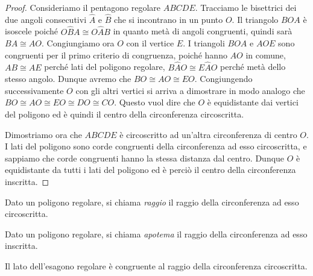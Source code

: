 \begin{proof}
Consideriamo il pentagono regolare $ABCDE$. Tracciamo le bisettrici 
dei due angoli consecutivi $\widehat{A}$ e $\widehat{B}$ che si 
incontrano in un punto $O$. Il triangolo $BOA$ è isoscele poiché 
$O\widehat{B}A\cong O\widehat{A}B$ in quanto metà di angoli 
congruenti, quindi sarà $BA\cong AO$. Congiungiamo ora $O$ con il 
vertice $E$. I triangoli $BOA$ e $AOE$ sono congruenti per il primo 
criterio di congruenza, poiché hanno $AO$ in comune, $AB\cong AE$ 
perché lati del poligono regolare, $B\widehat{A}O\cong E\widehat{A}O$ 
perché metà dello stesso angolo. Dunque avremo che $BO\cong AO\cong 
EO$. Congiungendo successivamente $O$ con gli altri vertici si arriva 
a dimostrare in modo analogo che $BO\cong AO\cong EO\cong DO\cong 
CO$. Questo vuol dire che $O$ è equidistante dai vertici del poligono 
ed è quindi il centro della circonferenza circoscritta.

Dimostriamo ora che $ABCDE$ è circoscritto ad un'altra circonferenza 
di centro $O$. I lati del poligono sono corde congruenti della 
circonferenza ad esso circoscritta, e sappiamo che corde congruenti 
hanno la stessa distanza dal centro. Dunque $O$ è equidistante da 
tutti i lati del poligono ed è perciò il centro della circonferenza 
inscritta. 
\end{proof}

\begin{definizione}
Dato un poligono regolare, si chiama \emph{raggio} il raggio della 
circonferenza ad esso circoscritta.
\end{definizione}

\begin{definizione}
Dato un poligono regolare, si chiama \emph{apotema} il raggio della 
circonferenza ad esso inscritta.
\end{definizione}

\begin{teorema}
Il lato dell'esagono regolare è congruente al raggio della 
circonferenza circoscritta.
\end{teorema}


\begin{inaccessibleblock}
 \begin{figure}[!htb]
	\centering
\end{figure}
\end{inaccessibleblock}

